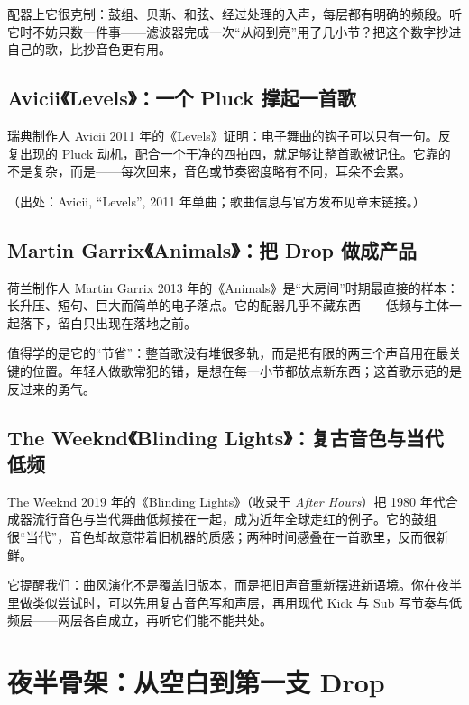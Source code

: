 配器上它很克制：鼓组、贝斯、和弦、经过处理的入声，每层都有明确的频段。听它时不妨只数一件事——滤波器完成一次“从闷到亮”用了几小节？把这个数字抄进自己的歌，比抄音色更有用。

\subsection{Avicii《Levels》：一个 Pluck 撑起一首歌}
\label{sec:edm-case-avicii}

瑞典制作人 Avicii 2011 年的《Levels》证明：电子舞曲的钩子可以只有一句。反复出现的 Pluck 动机，配合一个干净的四拍四，就足够让整首歌被记住。它靠的不是复杂，而是——每次回来，音色或节奏密度略有不同，耳朵不会累。

（出处：Avicii, “Levels”, 2011 年单曲；歌曲信息与官方发布见章末链接。）

\subsection{Martin Garrix《Animals》：把 Drop 做成产品}
\label{sec:edm-case-garrix}

荷兰制作人 Martin Garrix 2013 年的《Animals》是“大房间”时期最直接的样本：长升压、短句、巨大而简单的电子落点。它的配器几乎不藏东西——低频与主体一起落下，留白只出现在落地之前。

值得学的是它的“节省”：整首歌没有堆很多轨，而是把有限的两三个声音用在最关键的位置。年轻人做歌常犯的错，是想在每一小节都放点新东西；这首歌示范的是反过来的勇气。

\subsection{The Weeknd《Blinding Lights》：复古音色与当代低频}
\label{sec:edm-case-weeknd}

The Weeknd 2019 年的《Blinding Lights》（收录于 \emph{After Hours}）把 1980 年代合成器流行音色与当代舞曲低频接在一起，成为近年全球走红的例子。它的鼓组很“当代”，音色却故意带着旧机器的质感；两种时间感叠在一首歌里，反而很新鲜。

它提醒我们：曲风演化不是覆盖旧版本，而是把旧声音重新摆进新语境。你在夜半里做类似尝试时，可以先用复古音色写和声层，再用现代 Kick 与 Sub 写节奏与低频层——两层各自成立，再听它们能不能共处。

\section{夜半骨架：从空白到第一支 Drop}
\label{sec:edm-yeban}


